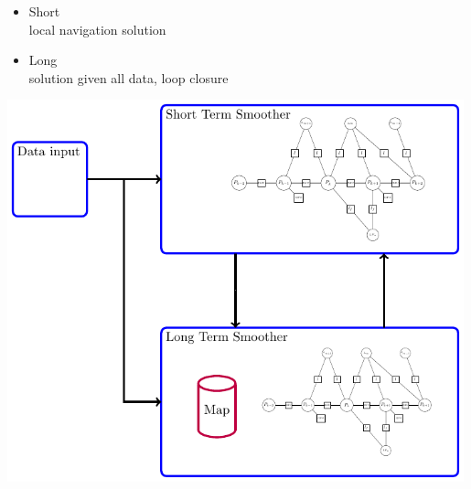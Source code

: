 \documentclass[%
    fourtothree=true, %
    DepLogo=true     %
    ]{ETHpres}
\begin{document}
\begin{minipage}{0.35\textwidth}
	\begin{itemize}
		\item[\ETHitem] \normalsize Short\\ \footnotesize local navigation solution
		\vspace*{3\baselineskip}
		\item[\ETHitem] \normalsize Long\\ \footnotesize solution given all data, loop closure
\end{itemize}
\end{minipage}
\begin{minipage}{0.64\textwidth}
	\centering
	\includegraphics[width=0.99\textwidth]{TikZ_drawings/Simple_STS_and_LTS_diagram_2/Simple_STS_and_LTS_2.pdf}\\
\end{minipage}

\clearpage

\ETHslide
\end{document}
